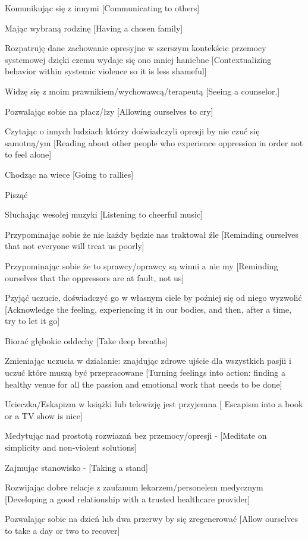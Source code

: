 \begin{multicols}{2}
\begin{checkboxlist}
\item Komunikując się z innymi [Communicating to others]
\item Mając wybraną rodzinę [Having a chosen family]
\item Rozpatruję dane zachowanie opresyjne w szerszym kontekście przemocy systemowej dzięki czemu wydaje się ono mniej haniebne [Contextualizing behavior within systemic violence so it is less shameful]
\item Widzę się z moim prawnikiem/wychowawcą/terapeutą [Seeing a counselor.]
\item Pozwalając sobie na płacz/łzy [Allowing ourselves to cry]
\item Czytając o innych ludziach którzy doświadczyli opresji by nie czuć się samotną/ym [Reading about other people who experience oppression in order not to feel alone]
\item Chodząc na wiece [Going to rallies]
\item Pisząć
\item Słuchając wesołej muzyki [Listening to cheerful music]
\item Przypominając sobie że nie każdy będzie nas traktował źle [Reminding ourselves that not everyone will treat us poorly]
\item Przypominając sobie że to sprawcy/oprawcy są winni a nie my [Reminding ourselves that the oppressors are at fault, not us]
\item Pzyjąć uczucie, doświadczyć go w własnym ciele by poźniej się od niego wyzwolić [Acknowledge the feeling, experiencing it in our bodies, and then, after a time, try to let it go]
\item Biorać głębokie oddechy [Take deep breaths]
\item Zmieniając uczucia w działanie: znajdując zdrowe ujście dla wszystkich pasjii i uczuć które muszą być przepracowane [Turning feelings into action: finding a healthy venue for all the passion and emotional work that needs to be done]
\item Ucieczka/Eskapizm w książki lub telewizję jest przyjemna [ Escapism into a book or a TV show is nice]
\item Medytując nad prostotą rozwiazań bez przemocy/opresji - [Meditate on simplicity and non-violent solutions]
\item Zajmując stanowisko - [Taking a stand]
\item Rozwijając dobre relacje z zaufanum lekarzem/personelem medycznym [Developing a good relationship with a trusted healthcare provider]
\item Pozwalając sobie na dzień lub dwa przerwy by się zregenerować [Allow ourselves to take a day or two to recover]

\end{checkboxlist}
\end{multicols}
